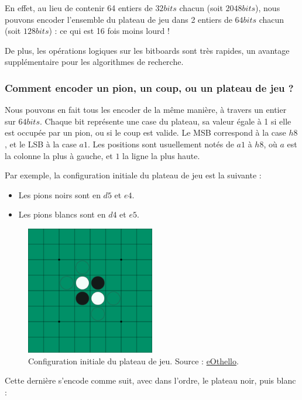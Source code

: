 En effet, au lieu de contenir 64 entiers de $32 bits$ chacun (soit $2048 bits$), nous pouvons encoder l'ensemble du plateau de jeu dans 2 entiers de $64 bits$ chacun (soit $128bits$) : ce qui est 16 fois moins lourd ! 

De plus, les opérations logiques sur les bitboards sont très rapides, un avantage supplémentaire pour les algorithmes de recherche.

\subsubsection{Comment encoder un pion, un coup, ou un plateau de jeu ?}
\label{subsubsec:enc}
Nous pouvons en fait tous les encoder de la même manière, à travers un entier sur $64bits$. Chaque bit représente une case du plateau, sa valeur égale à 1 si elle est occupée par un pion, ou si le coup est valide. Le \ac{MSB} correspond à la case $h8$, et le \ac{LSB} à la case $a1$. Les positions sont usuellement notés de $a1$ à $h8$, où $a$ est la colonne la plus à gauche, et $1$ la ligne la plus haute. \cite{brian_rose_2005} 

Par exemple, la configuration initiale du plateau de jeu est la suivante :
\begin{itemize}
    \item Les pions noirs sont en $d5$ et $e4$.
    \item Les pions blancs sont en $d4$ et $e5$.
\end{itemize}

\begin{figure}[H]
    \centering
    \includegraphics[width=0.5\textwidth]{ressources/plateau_init.png}
    \caption{Configuration initiale du plateau de jeu. Source : \href{https://www.eothello.com/}{eOthello}.}
    \label{fig:init_board}
\end{figure}

Cette dernière s'encode comme suit, avec dans l'ordre, le plateau noir, puis blanc :

